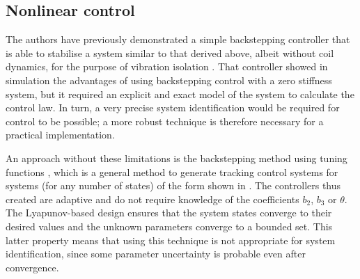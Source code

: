 \subsection{Nonlinear control}

The authors have previously demonstrated a simple backstepping
controller that is able to stabilise a system similar to that derived
above, albeit without coil dynamics, for the purpose of vibration
isolation \cite{robertson2006}. That controller showed in simulation
the advantages of using backstepping control with a zero stiffness
system, but it required an explicit and exact model of the system to
calculate the control law. In turn, a very precise system
identification would be required for control to be possible; a
more robust technique is therefore necessary for a practical implementation.

An approach without these limitations is the backstepping method using
tuning functions \cite[\S4.5.1]{krstic1995}, which is a general method
to generate tracking control systems for systems (for any number of
states) of the form shown in . The controllers thus
created are adaptive and do not require knowledge of the coefficients
$b_2$, $b_3$ or $\theta$. The Lyapunov-based design ensures that the
system states converge to their desired values and the unknown
parameters converge to a bounded set.  This latter property means that
using this technique is not appropriate for system identification,
since some parameter uncertainty is probable even after convergence.

